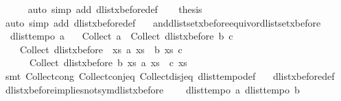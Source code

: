 \begin{isabellebody}
\ \ \ \ \isamarkupfalse%
\ {\isacharparenleft}auto\ simp\ add{\isacharcolon}\ dlist{\isacharunderscore}xbefore{\isacharunderscore}def{\isacharparenright}\isanewline
\ \ \isamarkupfalse%
\ {\isacharquery}thesis\ \isamarkupfalse%
\ {}\ \isamarkupfalse%
\ {\isacharparenleft}auto\ simp\ add{\isacharcolon}\ dlist{\isacharunderscore}xbefore{\isacharunderscore}def{\isacharparenright}\ \ \isanewline
{}\isamarkupfalse%
%
\endisatagproof
{\isafoldproof}%
%
\isadelimproof
\isanewline
%
\endisadelimproof
\isanewline
{}\isamarkupfalse%
\ and{\isacharunderscore}dlistset{\isacharunderscore}xbefore{\isacharunderscore}equiv{\isacharunderscore}or{\isacharunderscore}dlistset{\isacharunderscore}xbefore{\isacharcolon}\ \isanewline
\ \ {\isachardoublequoteopen}dlist{\isacharunderscore}tempo{}\ a\ {\isasymLongrightarrow}\isanewline
\ \ {\isacharparenleft}{\isacharparenleft}Collect\ a{\isacharparenright}\ {\isasyminter}\ {\isacharparenleft}Collect\ {\isacharparenleft}dlist{\isacharunderscore}xbefore\ b\ c{\isacharparenright}{\isacharparenright}{\isacharparenright}{\isacharequal}\ \isanewline
\ \ \ \ {\isacharparenleft}Collect\ {\isacharparenleft}dlist{\isacharunderscore}xbefore\ {\isacharparenleft}{\isasymlambda}\ xs{\isachardot}\ a\ xs\ {\isasymand}\ b\ xs{\isacharparenright}\ c{\isacharparenright}\ {\isasymunion}\isanewline
\ \ \ \ \ \ Collect\ {\isacharparenleft}dlist{\isacharunderscore}xbefore\ b\ {\isacharparenleft}{\isasymlambda}xs{\isachardot}\ a\ xs\ {\isasymand}\ c\ xs{\isacharparenright}{\isacharparenright}{\isacharparenright}{\isachardoublequoteclose}\isanewline
%
\isadelimproof
%
\endisadelimproof
%
\isatagproof
{}\isamarkupfalse%
\ {\isacharparenleft}smt\ Collect{\isacharunderscore}cong\ Collect{\isacharunderscore}conj{\isacharunderscore}eq\ Collect{\isacharunderscore}disj{\isacharunderscore}eq\ dlist{\isacharunderscore}tempo{}{\isacharunderscore}def\ \isanewline
\ \ dlist{\isacharunderscore}xbefore{\isacharunderscore}def{\isacharparenright}%
\endisatagproof
{\isafoldproof}%
%
\isadelimproof
\isanewline
%
\endisadelimproof
\isanewline
{}\isamarkupfalse%
\ dlist{\isacharunderscore}xbefore{\isacharunderscore}implies{\isacharunderscore}not{\isacharunderscore}sym{\isacharunderscore}dlist{\isacharunderscore}xbefore{\isacharcolon}\ {\isachardoublequoteopen}\ \isanewline
\ \ {\isasymlbrakk}dlist{\isacharunderscore}tempo{}\ a{\isacharsemicolon}\ dlist{\isacharunderscore}tempo{}\ b{\isasymrbrakk}\ {\isasymLongrightarrow}\ \isanewline

\end{isabellebody}
